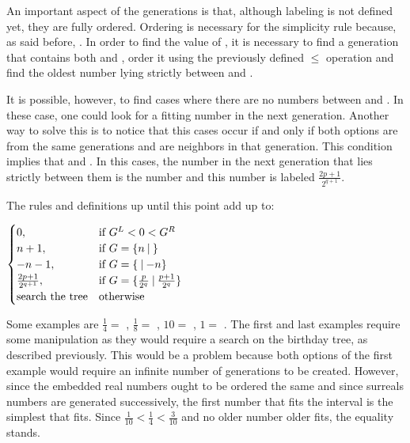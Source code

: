 An important aspect of the generations is that, although labeling is not defined yet, they are fully ordered. Ordering is necessary for the simplicity rule because, as said before, . In order to find the value of \Gm{}, it is necessary to find a generation that contains both  and , order it using the previously defined $\leq$ operation and find the oldest number lying strictly between  and .

It is possible, however, to find cases where there are no numbers between  and . In these case, one could look for a fitting number in the next generation. Another way to solve this is to notice that this cases occur if and only if both options are from the same generations and are neighbors in that generation. This condition implies that  and . In this cases, the number in the next generation that lies strictly between them is the number \Gm{} and this number is labeled $\frac{2p + 1}{2^{q+1}}$.

The rules and definitions up until this point add up to:

\begin{center}
\Gm{ =} 
$
\begin{cases}
	0, &\text{if } G^L < 0 < G^R\\
	n+1, &\text{if } \mbox{$G= \mbox{$\{n\:|\:\}$}$}\\
	-n-1, &\text{if } \mbox{$G= \mbox{$\{\:|\:{-}n\}$}$}\\
	\frac{2p + 1}{2^{q+1}}, &\text{if } \mbox{$G= \mbox{$\{\frac{p}{2^q}\:|\: \frac{p+1}{2^q}\}$}$}\\
	\text{search the tree} &\text{otherwise}
\end{cases}
$
\end{center}

\vspace{0.6em}Some examples are $\frac{1}{4} =$ , $\frac{1}{8} =$ , $10 =$ , $1 =$ . The first and last examples require some manipulation as they would require a search on the birthday tree, as described previously. This would be a problem because both options of the first example would require an infinite number of generations to be created. However, since the embedded real numbers ought to be ordered the same and since surreals numbers are generated successively, the first number that fits the interval is the simplest that fits. Since $\frac{1}{10} < \frac{1}{4} < \frac{3}{10}$ and no older number older fits, the equality stands.

